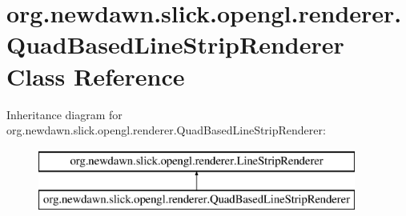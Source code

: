 \hypertarget{classorg_1_1newdawn_1_1slick_1_1opengl_1_1renderer_1_1_quad_based_line_strip_renderer}{}\section{org.\+newdawn.\+slick.\+opengl.\+renderer.\+Quad\+Based\+Line\+Strip\+Renderer Class Reference}
\label{classorg_1_1newdawn_1_1slick_1_1opengl_1_1renderer_1_1_quad_based_line_strip_renderer}
Inheritance diagram for org.\+newdawn.\+slick.\+opengl.\+renderer.\+Quad\+Based\+Line\+Strip\+Renderer\+:\begin{figure}[H]
\begin{center}
\leavevmode
\includegraphics[height=2.000000cm]{classorg_1_1newdawn_1_1slick_1_1opengl_1_1renderer_1_1_quad_based_line_strip_renderer}
\end{center}
\end{figure}
